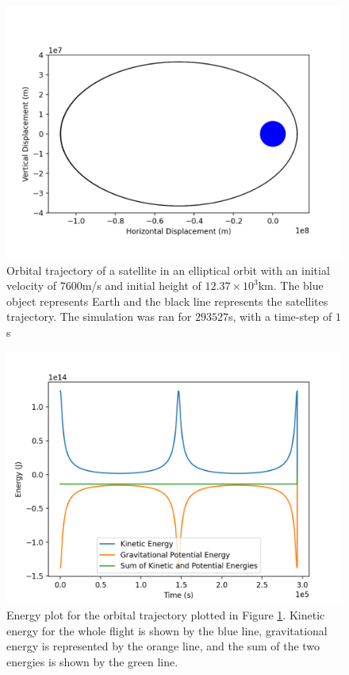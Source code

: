 \documentclass[twocolumn, prl, nobalancelastpage, aps, citeautoscript, longbibliography, 10pt]{revtex4-1}
\begin{document}
\begin{figure}[h]
\includegraphics[width = 0.96\linewidth]{EllipticalOrbit2d.png}
\caption{Orbital trajectory of a satellite in an elliptical orbit with an initial velocity of $7600$m/s and initial height of $12.37\times10^3$km. The blue object represents Earth
and the black line represents the satellites trajectory. The simulation was ran for $293527$s, with a time-step of $1$s}
\label{EllipticalOrbit}
\end{figure}
\begin{figure}[h!]
\includegraphics[width = 0.96\linewidth]{EllipticalEnergy.png}
\caption{Energy plot for the orbital trajectory plotted in Figure \ref{EllipticalOrbit}. Kinetic energy for the whole flight is shown by the blue line, gravitational energy 
is represented by the orange line, and the sum of the two energies is shown by the green line.}
\label{EllipticalOrbitEnergy}
\end{figure}
\end{document}
